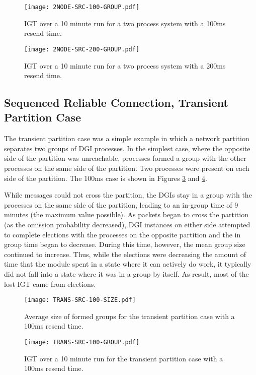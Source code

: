 \begin{figure}[htbp]
    \centering
    \texttt{[image: 2NODE-SRC-100-GROUP.pdf]}
    \caption{\ac{IGT} over a 10 minute run for a two process system with a 100ms resend time.}
    \label{fig:IGT-SRC-2NODE-100}
\end{figure}

\begin{figure}[htbp]
    \centering
    \texttt{[image: 2NODE-SRC-200-GROUP.pdf]}
    \caption{\ac{IGT} over a 10 minute run for a two process system with a 200ms resend time.}
    \label{fig:IGT-SRC-2NODE-200}
\end{figure}

\subsection{Sequenced Reliable Connection, Transient Partition Case}


The transient partition case was a simple example in which a network partition separates two groups of DGI processes.
In the simplest case, where the opposite side of the partition was unreachable, processes formed a group with the other processes on the same side of the partition.
Two processes were present on each side of the partition.
The 100ms case is shown in Figures \ref{fig:MGS-SRC-TRANS-100} and \ref{fig:IGT-SRC-TRANS-100}.

While messages could not cross the partition, the DGIs stay in a group with the processes on the same side of the partition, leading to an in-group time of 9 minutes (the maximum value possible).
As packets began to cross the partition (as the omission probability decreased), DGI instances on either side attempted to complete elections with the processes on the opposite partition and the in group time began to decrease.
During this time, however, the mean group size continued to increase.
Thus, while the elections were decreasing the amount of time that the module spent in a state where it can actively do work, it typically did not fall into a state where it was in a group by itself. 
As result, most of the lost \ac{IGT} came from elections.
\begin{figure}[htbp]
    \centering
    \texttt{[image: TRANS-SRC-100-SIZE.pdf]}
    \caption{Average size of formed groups for the transient partition case with a 100ms resend time.}
    \label{fig:MGS-SRC-TRANS-100}
\end{figure}%
\begin{figure}[htbp]
    \centering
    \texttt{[image: TRANS-SRC-100-GROUP.pdf]}
    \caption{\ac{IGT} over a 10 minute run for the transient partition case with a 100ms resend time.}
    \label{fig:IGT-SRC-TRANS-100}
\end{figure}

